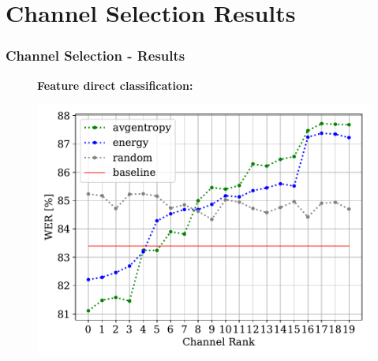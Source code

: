 \documentclass{beamer}
\begin{document}
\section{Channel Selection Results}
\begin{frame}
  \frametitle{Channel Selection - Results}
  \vspace{-.5em}
  
  \begin{figure}[!t]
  \begin{minipage}[tb]{.55\textwidth}
    \textbf{Feature direct classification:}
    \vspace{-.8em}
    {\scriptsize    
     
    }
  \end{minipage}%
  \hfill
  \begin{minipage}[tb]{.42\textwidth}
    \includegraphics[width=\textwidth]{img/wer_over_feat_ranks-S02.pdf}
  \end{minipage}
  \end{figure}
  
  \vspace{-.5em}  

  

\end{frame}
\end{document}
